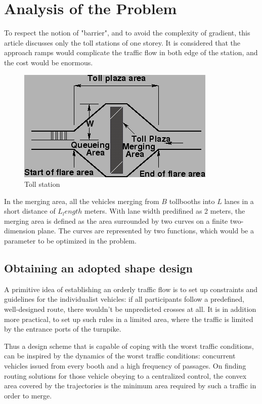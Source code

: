 \documentclass{mcmthesis}
\begin{document}
\section{Analysis of the Problem}
To respect the notion of "barrier", and to avoid the complexity of gradient, this article discusses only the toll stations of one storey. It is considered that the approach ramps would complicate the traffic flow in both edge of the station, and the cost would be enormous.

\begin{figure}[htbp]
	\small
	\centering
	\caption{Toll station \cite{note}} \label{fig:Ts}
	\includegraphics{img3.png}
\end{figure}

In the merging area, all the vehicles merging from $B$ tollbooths into $L$ lanes in a short distance of $L_length$ meters.
With lane width predifined as 2 meters, the merging area is defined as the area surrounded by two curves on a finite two-dimension plane. The curves are represented by two functions, which would be a parameter to be optimized in the problem.

\subsection{Obtaining an adopted shape design}

A primitive idea of establishing an orderly traffic flow is to set up constraints and guidelines for the individualist vehicles: if all participants follow a predefined, well-designed route, there wouldn't be unpredicted crosses at all. It is in addition more practical, to set up such rules in a limited area, where the traffic is limited by the entrance ports of the turnpike.

Thus a design scheme that is capable of coping with the worst traffic conditions, can be inspired by the dynamics of the worst traffic conditions: concurrent vehicles issued from every booth and a high frequency of passages. On finding routing solutions for those vehicle obeying to a centralized control, the convex area covered by the trajectories is the minimum area required by such a traffic in order to merge.
\end{document}
